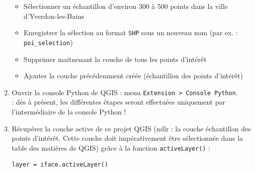 \documentclass[11pt]{article}
\begin{document}
\begin{enumerate}
\begin{itemize}
\item Sélectionner un échantillon d'environ 300 à 500 points dans la ville d'Yverdon-les-Bains
\item Enregistrer la sélection au format \texttt{SHP} sous un nouveau nom (par ex. : \og{}\texttt{poi\_selection}\fg{})
\item Supprimer maitnenant la couche de tous les points d'intérêt
\item Ajouter la couche précédemment créée (échantillon des points d'intérêt) 
\end{itemize}
\item Ouvrir la console Python de QGIS : menu \og{}\texttt{Extension > Console Python}\fg{}.\\
\underline{}: dès à présent, les différentes étapes seront effectuées uniquement par l'intermédiaire de la console Python ! 
\item Récupérer la couche active de ce projet QGIS (ndlr : la couche échantillon des points d'intérêt. Cette couche doit impérativement être sélectionnée dans la table des matières de QGIS) grâce à la fonction \texttt{activeLayer()} :
\vspace*{-1em}
\begin{center}
\begin{minipage}[t]{0.32\textwidth}
\begin{verbatim}
layer = iface.activeLayer() 
\end{verbatim}
\end{minipage}
\end{center}
\vspace*{1em}


\end{enumerate}
\end{document}
